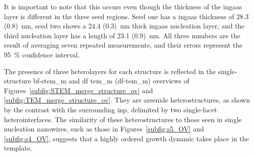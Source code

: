 It is important to note that this occurs even though the thickness of the \acs{ingaas} layer is different in the three seed regions. Seed one has a \acs{ingaas} thickness of \qty[separate-uncertainty=true]{28.3 (0.8)}{\nano\metre}, seed two shows a \qty[separate-uncertainty=true]{24.4 (0.3)}{\nano\metre} thick \acs{ingaas} nucleation layer, and the third nucleation layer has a length of \qty[separate-uncertainty=true]{23.1 (0.9)}{\nano\metre}. All three numbers are the result of averaging seven repeated measurements, and their errors represent the \qty{95}{\%} confidence interval. 

The presence of three heterolayers for each structure is reflected in the single-structure \acs{bf}-\acs{stem_m} and \acl{df} \acl{tem_m} (\acs{df}-\acs{tem_m}) overviews of Figures~\ref{subfig:STEM_merge_structure_ov} and \ref{subfig:TEM_merge_structure_ov}. They are arsenide heterostructures, as shown by the contrast with the surrounding \acs{inp}, delimited by two single-facet  heterointerfaces. The similarity of these heterostructures to those seen in single nucleation nanowires, such as those in Figures~\ref{subfig:s5_OV} and \ref{subfig:s4_OV}, suggests that a highly ordered growth dynamic takes place in the template.

